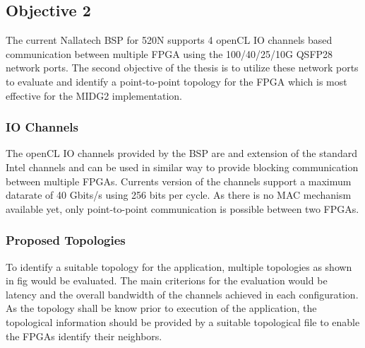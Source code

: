 \documentclass[english,notitlepage]{hgbreport}
\begin{document}
\subsection{Objective 2}

The current Nallatech BSP for 520N supports 4 openCL IO channels based communication between
multiple FPGA using the 100/40/25/10G QSFP28 network ports. The second objective of
the thesis is to utilize these network ports to evaluate and identify a point-to-point
topology for the FPGA which is most effective for the MIDG2 implementation.

\subsubsection{IO Channels}

The openCL IO channels provided by the BSP are and extension of the standard Intel channels \cite{noauthor_intel_2018}
and can be used in similar way to provide blocking communication between multiple FPGAs.
Currents version of the channels support a maximum datarate of 40 Gbits/s using 256 bits per cycle.
As there is no MAC mechanism available yet, only point-to-point communication is possible between
two FPGAs.

\subsubsection{Proposed Topologies}

To identify a suitable topology for the application, multiple topologies
as shown in fig would be evaluated. The main criterions for the evaluation
would be latency and the overall bandwidth of the channels achieved in each
configuration. As the topology shall be know prior to execution of the application,
the topological information should be provided by a suitable topological file
to enable the FPGAs identify their neighbors.
\end{document}
